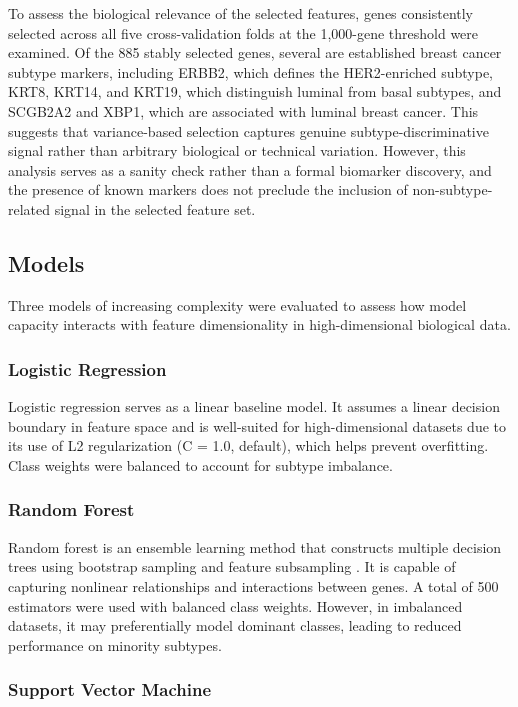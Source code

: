 \documentclass[10pt,twocolumn,letterpaper]{article}
\begin{document}
To assess the biological relevance of the selected features, genes consistently selected across all five cross-validation folds at the 1,000-gene threshold were examined. Of the 885 stably selected genes, several are established breast cancer subtype markers, including ERBB2, which defines the HER2-enriched subtype, KRT8, KRT14, and KRT19, which distinguish luminal from basal subtypes, and SCGB2A2 and XBP1, which are associated with luminal breast cancer. This suggests that variance-based selection captures genuine subtype-discriminative signal rather than arbitrary biological or technical variation. However, this analysis serves as a sanity check rather than a formal biomarker discovery, and the presence of known markers does not preclude the inclusion of non-subtype-related signal in the selected feature set.

\subsection{Models}

Three models of increasing complexity were evaluated to assess how model capacity interacts with feature dimensionality in high-dimensional biological data.

\subsubsection{Logistic Regression}

Logistic regression serves as a linear baseline model. It assumes a linear decision boundary in feature space and is well-suited for high-dimensional datasets due to its use of L2 regularization (C = 1.0, default), which helps prevent overfitting. Class weights were balanced to account for subtype imbalance.

\subsubsection{Random Forest}

Random forest is an ensemble learning method that constructs multiple decision trees using bootstrap sampling and feature subsampling \cite{breiman2001}. It is capable of capturing nonlinear relationships and interactions between genes. A total of 500 estimators were used with balanced class weights. However, in imbalanced datasets, it may preferentially model dominant classes, leading to reduced performance on minority subtypes.

\subsubsection{Support Vector Machine}
\end{document}
